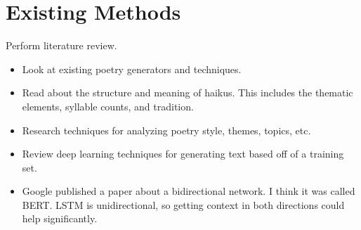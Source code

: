 \section{Existing Methods}\label{sec:methods}

{\color{red}
      Perform literature review.

      \begin{itemize}
            \item Look at existing poetry generators and techniques.
            \item Read about the structure and meaning of haikus.
                  This includes the thematic elements, syllable counts, and tradition.
            \item Research techniques for analyzing poetry style, themes, topics, etc.
            \item Review deep learning techniques for generating text based off of a training set.
            \item Google published a paper about a bidirectional network.
                  I think it was called BERT.
                  LSTM is unidirectional, so getting context in both directions could help significantly.
      \end{itemize}
}
